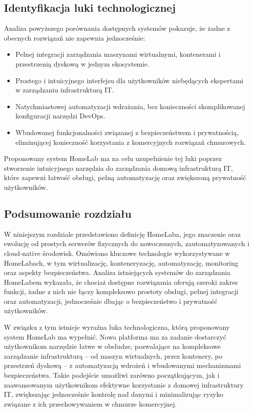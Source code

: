 \subsection{Identyfikacja luki technologicznej}
Analiza powyższego porównania dostępnych systemów pokazuje, że żadne z obecnych rozwiązań nie zapewnia jednocześnie:
\begin{itemize}
    \item Pełnej integracji zarządzania maszynami wirtualnymi, kontenerami i przestrzenią dyskową w jednym ekosystemie.
    \item Prostego i intuicyjnego interfejsu dla użytkowników niebędących ekspertami w zarządzaniu infrastrukturą IT.
    \item Natychmiastowej automatyzacji wdrażania, bez konieczności skomplikowanej konfiguracji narzędzi DevOps.
    \item Wbudowanej funkcjonalności związanej z bezpieczeństwem i prywatnością, eliminującej konieczność korzystania z komercyjnych rozwiązań chmurowych.
\end{itemize}

Proponowany system HomeLab ma na celu uzupełnienie tej luki poprzez stworzenie intuicyjnego narzędzia do zarządzania domową infrastrukturą IT, które zapewni łatwość obsługi, pełną automatyzację oraz zwiększoną prywatność użytkowników.

\subsection{Podsumowanie rozdziału}
W niniejszym rozdziale przedstawiono definicję HomeLaba, jego znaczenie oraz ewolucję od prostych serwerów fizycznych do nowoczesnych, zautomatyzowanych i cloud-native środowisk. Omówiono kluczowe technologie wykorzystywane w HomeLabach, w tym wirtualizację, konteneryzację, automatyzację, monitoring oraz aspekty bezpieczeństwa. Analiza istniejących systemów do zarządzania HomeLabem wykazała, że chociaż dostępne rozwiązania oferują szeroki zakres funkcji, żadne z nich nie łączy kompleksowo prostoty obsługi, pełnej integracji oraz automatyzacji, jednocześnie dbając o bezpieczeństwo i prywatność użytkowników.

W związku z tym istnieje wyraźna luka technologiczna, którą proponowany system HomeLab ma wypełnić. Nowa platforma ma za zadanie dostarczyć użytkownikom narzędzie łatwe w obsłudze, pozwalające na kompleksowe zarządzanie infrastrukturą – od maszyn wirtualnych, przez kontenery, po przestrzeń dyskową – z automatyzacją wdrożeń i wbudowanymi mechanizmami bezpieczeństwa. Takie podejście umożliwi zarówno początkującym, jak i zaawansowanym użytkownikom efektywne korzystanie z domowej infrastruktury IT, zwiększając jednocześnie kontrolę nad danymi i minimalizując ryzyko związane z ich przechowywaniem w chmurze komercyjnej.
